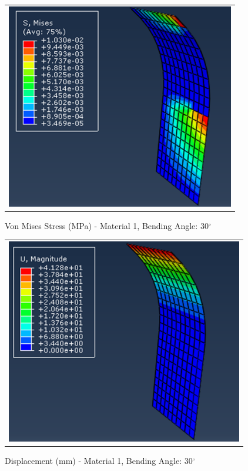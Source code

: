 \documentclass[a4paper,12pt]{article}
\numberwithin{equation}{section}
\numberwithin{figure}{section}
\begin{document}
\begin{figure}[H]
  \centering
  \begin{tabular}{@{}c@{}}
    \includegraphics[width=0.7\linewidth,height=255pt]{Results/Bending/M1_VMS_30.png} \\
  \end{tabular}
  \caption{Von Mises Stress (MPa) - Material 1,  Bending Angle: 30$^{\circ}$ }
\end{figure}

\begin{figure}[H]
  \centering
  \begin{tabular}{@{}c@{}}
    \includegraphics[width=0.7\linewidth,height=255pt]{Results/Bending/M1_DIS_30.png} \\
  \end{tabular}
  \caption{Displacement (mm) - Material 1, Bending Angle: 30$^{\circ}$ }
\end{figure}
\end{document}
